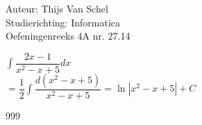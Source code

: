 \documentclass[a4paper]{article}
\newcommand{\dint}{\displaystyle\int}
\begin{document}
  
\noindent \large Auteur: Thijs Van Schel \\
\noindent \large Studierichting: Informatica\\
\noindent \large Oefeningenreeks 4A nr. 27.14\\

\medskip

\normalsize

$\dint \dfrac{2x-1}{x^2-x+5}dx$\\

$=\dfrac{1}{2}\dint \dfrac{d(x^2-x+5)}{x^2-x+5} = \ln |x^2-x+5| + C$\\

\begin{thebibliography}{999}
\end{thebibliography}
\end{document}

